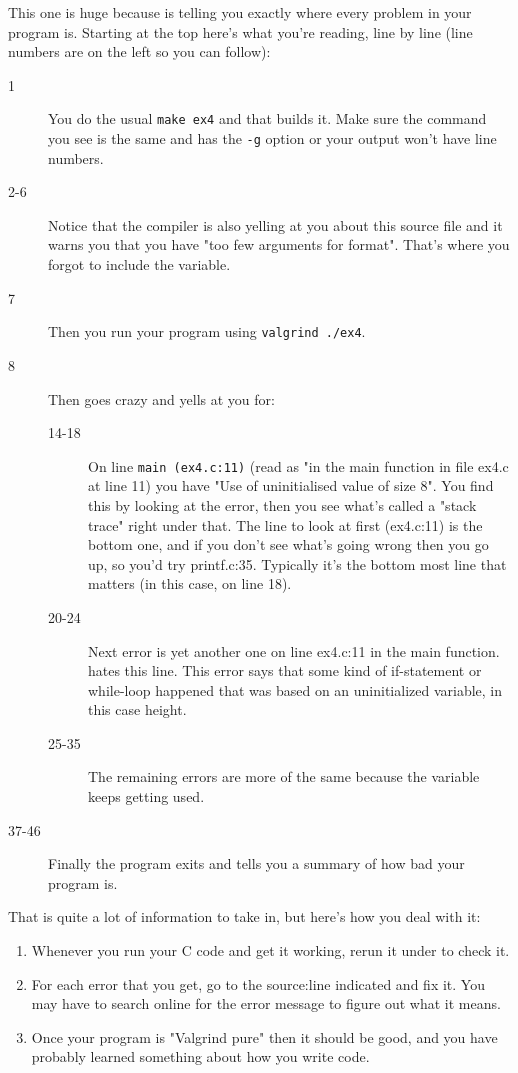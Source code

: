 This one is huge because  is telling you exactly where
every problem in your program is.  Starting at the top here's what you're
reading, line by line (line numbers are on the left so you can follow):

\begin{description}
\item[1] You do the usual \verb|make ex4| and that builds it. Make sure the  command
    you see is the same and has the \verb|-g| option or your  output won't
    have line numbers.
\item[2-6] Notice that the compiler is also yelling at you about this source file and it
    warns you that you have "too few arguments for format".  That's where you 
    forgot to include the  variable.
\item[7] Then you run your program using \verb|valgrind ./ex4|.
\item[8] Then  goes crazy and yells at you for:
    \begin{description}
        \item[14-18] On line \verb|main (ex4.c:11)| (read as "in the main function in
            file ex4.c at line 11) you have "Use of uninitialised value of size 8".
            You find this by looking at the error, then you see what's called a "stack trace"
            right under that.  The line to look at first (ex4.c:11) is the bottom one, 
            and if you don't see what's going wrong then you go up, so you'd try
            printf.c:35.  Typically it's the bottom most line that matters (in this case, on line 18).
        \item[20-24] Next error is yet another one on line ex4.c:11 in the main function. 
            hates this line.  This error says that some kind of if-statement or while-loop
            happened that was based on an uninitialized variable, in this case height.
        \item[25-35] The remaining errors are more of the same because the variable keeps getting
        used.
    \end{description}
\item[37-46] Finally the program exits and  tells you a summary of how bad
    your program is.
\end{description}

That is quite a lot of information to take in, but here's how you deal with it:

\begin{enumerate}
\item Whenever you run your C code and get it working, rerun it under 
    to check it.
\item For each error that you get, go to the source:line indicated and
    fix it.  You may have to search online for the error message to figure out
    what it means.
\item Once your program is "Valgrind pure" then it should be good, and you
    have probably learned something about how you write code.
\end{enumerate}

